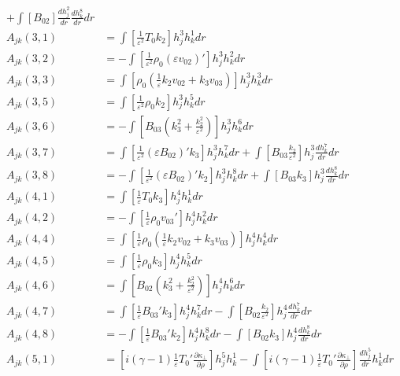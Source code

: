 \documentclass[11pt, fleqn]{article}
\newcommand{\eps}{\varepsilon}
\begin{document}
\begin{align*}
					+\int \left[B_{02}\right]\frac{dh_j^2}{dr}\frac{dh_k^8}{dr}dr																		\\
	A_{jk}(3, 1) &=  \int \left[\frac{1}{\eps^2}T_0k_2\right]h_j^3 h_k^1 dr																				\\
	A_{jk}(3, 2) &= -\int \left[\frac{1}{\eps^2}\rho_0(\eps v_{02})'\right]h_j^3 h_k^2 dr																\\
	A_{jk}(3, 3) &=  \int \left[\rho_0\left(\frac{1}{\eps}k_2v_{02} + k_3v_{03}\right)\right] h_j^3 h_k^3 dr											\\
	A_{jk}(3, 5) &=  \int \left[\frac{1}{\eps^2}\rho_0k_2\right] h_j^3 h_k^5 dr																			\\
	A_{jk}(3, 6) &= -\int \left[B_{03}\left(k_3^2 + \frac{k_2^2}{\eps^2}\right)\right]h_j^3 h_k^6 dr													\\
	A_{jk}(3, 7) &=  \int \left[\frac{1}{\eps^2}(\eps B_{02})'k_3\right] h_j^3 h_k^7 dr  +  \int \left[ B_{03}\frac{k_2}{\eps^2}\right] h_j^3 \frac{dh_k^7}{dr} dr	\\
	A_{jk}(3, 8) &= -\int \left[\frac{1}{\eps^2}(\eps B_{02})'k_2\right] h_j^3 h_k^8 dr  +  \int \left[ B_{03}k_3\right]h_j^3 \frac{dh_k^8}{dr} dr		\\
	A_{jk}(4, 1) &=  \int \left[\frac{1}{\eps}T_0k_3\right] h_j^4 h_k^1 dr																				\\
	A_{jk}(4, 2) &= -\int \left[\frac{1}{\eps}\rho_0v_{03}'\right] h_j^4 h_k^2 dr																		\\
	A_{jk}(4, 4) &=  \int \left[\frac{1}{\eps}\rho_0\left(\frac{1}{\eps}k_2v_{02} + k_3v_{03}\right)\right] h_j^4 h_k^4 dr								\\
	A_{jk}(4, 5) &=  \int \left[\frac{1}{\eps}\rho_0k_3\right] h_j^4 h_k^5 dr																			\\
	A_{jk}(4, 6) &=  \int \left[B_{02}\left(k_3^2 + \frac{k_2^2}{\eps^2}\right)\right] h_j^4 h_k^6 dr													\\
	A_{jk}(4, 7) &=  \int \left[\frac{1}{\eps}B_{03}'k_3\right] h_j^4 h_k^7 dr - \int \left[B_{02}\frac{k_2}{\eps^2}\right] h_j^4 \frac{dh_k^7}{dr}dr   \\
	A_{jk}(4, 8) &= -\int \left[\frac{1}{\eps}B_{03}'k_2\right] h_j^4 h_k^8 dr - \int \left[B_{02}k_3\right] h_j^4 \frac{dh_k^8}{dr} dr					\\
	A_{jk}(5, 1) &=  \left[i(\gamma - 1)\frac{1}{\eps}T_0'\frac{\partial \kappa_\bot}{\partial \rho}\right] h_j^5 h_k^1 - \int \left[i(\gamma - 1)\frac{1}{\eps}T_0'\frac{\partial \kappa_\bot}{\partial \rho}\right] \frac{dh_j^5}{dr} h_k^1 dr		\\

\end{align*}
\end{document}

